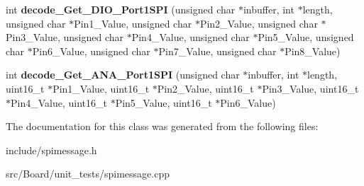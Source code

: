 \begin{DoxyCompactItemize}
\item 
\mbox{\label{classSPIMessageHandler_a2b9ff957d26bab1f655fa4ff2baf01d5}} 
int {\bfseries decode\+\_\+\+Get\+\_\+\+D\+I\+O\+\_\+\+Port1\+S\+PI} (unsigned char $\ast$inbuffer, int $\ast$length, unsigned char $\ast$Pin1\+\_\+\+Value, unsigned char $\ast$Pin2\+\_\+\+Value, unsigned char $\ast$Pin3\+\_\+\+Value, unsigned char $\ast$Pin4\+\_\+\+Value, unsigned char $\ast$Pin5\+\_\+\+Value, unsigned char $\ast$Pin6\+\_\+\+Value, unsigned char $\ast$Pin7\+\_\+\+Value, unsigned char $\ast$Pin8\+\_\+\+Value)
\item 
\mbox{\label{classSPIMessageHandler_ad9fc58bd2868dde40560fa16ed82764d}} 
int {\bfseries decode\+\_\+\+Get\+\_\+\+A\+N\+A\+\_\+\+Port1\+S\+PI} (unsigned char $\ast$inbuffer, int $\ast$length, uint16\+\_\+t $\ast$Pin1\+\_\+\+Value, uint16\+\_\+t $\ast$Pin2\+\_\+\+Value, uint16\+\_\+t $\ast$Pin3\+\_\+\+Value, uint16\+\_\+t $\ast$Pin4\+\_\+\+Value, uint16\+\_\+t $\ast$Pin5\+\_\+\+Value, uint16\+\_\+t $\ast$Pin6\+\_\+\+Value)
\end{DoxyCompactItemize}


The documentation for this class was generated from the following files\+:\begin{DoxyCompactItemize}
\item 
include/spimessage.\+h\item 
src/\+Board/unit\+\_\+tests/spimessage.\+cpp\end{DoxyCompactItemize}
